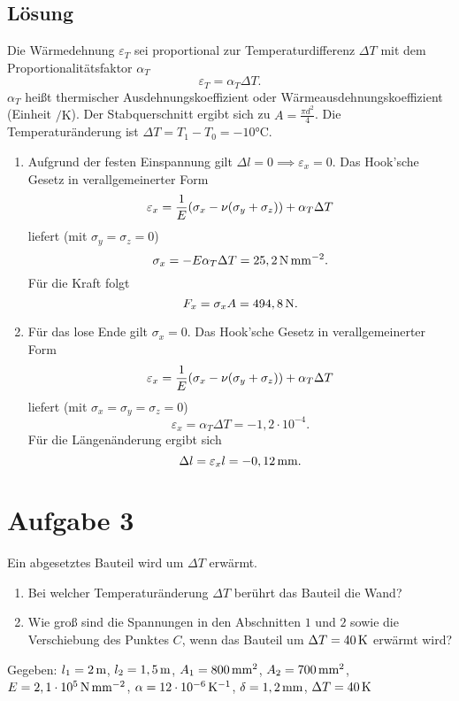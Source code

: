 \documentclass{exercise}
\begin{document}
    \subsection*{Lösung}
    Die Wärmedehnung \(\varepsilon_T\) sei proportional zur Temperaturdifferenz \(\Delta T\) mit dem Proportionalitätsfaktor \(\alpha_T\)
    \[
        \varepsilon_T = \alpha_T \Delta T.
    \]
    \(\alpha_T\) heißt thermischer Ausdehnungskoeffizient oder Wärmeausdehnungskoeffizient (Einheit \(\si{\per\kelvin}\)).
    Der Stabquerschnitt ergibt sich zu \(A = \frac{\pi d^2}{4}\).
    Die Temperaturänderung ist \(\Delta T = T_1 - T_0 = -10\si{\degreeCelsius}\).
    \begin{enumerate}
        \item Aufgrund der festen Einspannung gilt \(\Delta l = 0 \implies \varepsilon_x = 0\).
        Das Hook'sche Gesetz in verallgemeinerter Form
        \[
            \varepsilon_x = \frac{1}{E}\parentheses*{\sigma_x - \nu\parentheses*{\sigma_y + \sigma_z}} + \alpha_T \Delta T
        \]
        liefert (mit \(\sigma_y = \sigma_z = 0\))
        \[
            \sigma_x = -E\alpha_T \Delta T = 25,2\,\si{\newton\per\milli\meter\squared}.
        \]
        Für die Kraft folgt
        \[
            F_x = \sigma_x A = 494,8\,\si{\newton}.
        \]
        \item Für das lose Ende gilt \(\sigma_x = 0\).
        Das Hook'sche Gesetz in verallgemeinerter Form
        \[
            \varepsilon_x = \frac{1}{E}\parentheses*{\sigma_x - \nu\parentheses*{\sigma_y + \sigma_z}} + \alpha_T \Delta T
        \]
        liefert (mit \(\sigma_x = \sigma_y = \sigma_z = 0\))
        \[
            \varepsilon_x = \alpha_T \Delta T = -1,2 \cdot 10^{-4}.
        \]
        Für die Längenänderung ergibt sich
        \[
            \Delta l = \varepsilon_x l = -0,12\,\si{\milli\meter}.
        \]
    \end{enumerate}


    \section*{Aufgabe 3}

    \begin{problem}
        Ein abgesetztes Bauteil wird um \(\Delta T\) erwärmt.
        \begin{enumerate}
            \item Bei welcher Temperaturänderung \(\Delta T\) berührt das Bauteil die Wand?
            \item Wie groß sind die Spannungen in den Abschnitten \(1\) und \(2\) sowie die Verschiebung des Punktes \(C\), wenn das Bauteil um \(\Delta T = 40\,\si{\kelvin}\) erwärmt wird?
        \end{enumerate}
        Gegeben: \(l_1 = 2\,\si{\meter}\), \(l_2 = 1,5\,\si{\meter}\), \(A_1 = 800\,\si{\milli\meter\squared}\), \(A_2 = 700\,\si{\milli\meter\squared}\), \(E = 2,1 \cdot 10^5\,\si{\newton\per\milli\meter\squared}\), \(\alpha = 12 \cdot 10^{-6}\,\si{\per\kelvin}\), \(\delta = 1,2\,\si{\milli\meter}\), \(\Delta T = 40\,\si{\kelvin}\)
    \end{problem}
\end{document}
